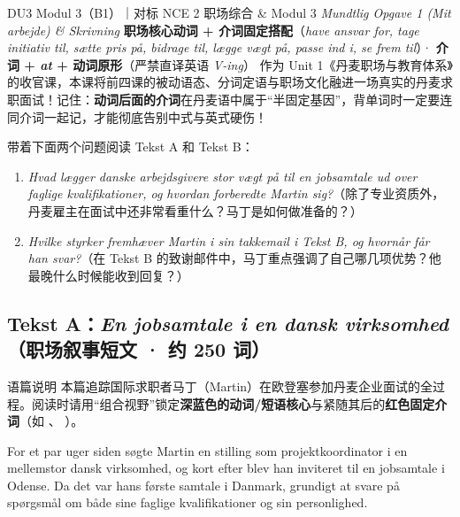 {DU3 Modul 3（B1）｜对标 NCE 2 职场综合 \& Modul 3 \textit{Mundtlig Opgave 1 (Mit arbejde) \& Skrivning}}
{\textbf{职场核心动词 + 介词固定搭配}（\textit{have ansvar for, tage initiativ til, sætte pris på, bidrage til, lægge vægt på, passe ind i, se frem til}）· \textbf{介词 + \textit{at} + 动词原形}（严禁直译英语 \textit{V-ing}）}
{作为 Unit 1《丹麦职场与教育体系》的收官课，本课将前四课的被动语态、分词定语与职场文化融进一场真实的丹麦求职面试！记住：\textbf{动词后面的介词}在丹麦语中属于“半固定基因”，背单词时一定要连同介词一起记，才能彻底告别中式与英式硬伤！}

\begin{foerduleaeser}
带着下面两个问题阅读 Tekst A 和 Tekst B：
\begin{enumerate}
  \item \textit{Hvad lægger danske arbejdsgivere stor vægt på til en jobsamtale ud over faglige kvalifikationer, og hvordan forberedte Martin sig?}（除了专业资质外，丹麦雇主在面试中还非常看重什么？马丁是如何做准备的？）
  \item \textit{Hvilke styrker fremhæver Martin i sin takkemail i Tekst B, og hvornår får han svar?}（在 Tekst B 的致谢邮件中，马丁重点强调了自己哪几项优势？他最晚什么时候能收到回复？）
\end{enumerate}
\end{foerduleaeser}


\subsection*{Tekst A：\textit{En jobsamtale i en dansk virksomhed}（职场叙事短文 · 约 250 词）}

\begin{tipbox}{语篇说明}
本篇追踪国际求职者马丁（Martin）在欧登塞参加丹麦企业面试的全过程。阅读时请用“组合视野”锁定\textbf{\color{NCDNavy}深蓝色的动词/短语核心}与紧随其后的\textbf{\color{NCDRed}红色固定介词}（如  、 ）。
\end{tipbox}

For et par uger siden søgte Martin en stilling som projektkoordinator i en mellemstor dansk virksomhed, og kort efter blev han inviteret til en jobsamtale i Odense. Da det var hans første samtale i Danmark,  grundigt  at svare på spørgsmål om både sine faglige kvalifikationer og sin personlighed.

